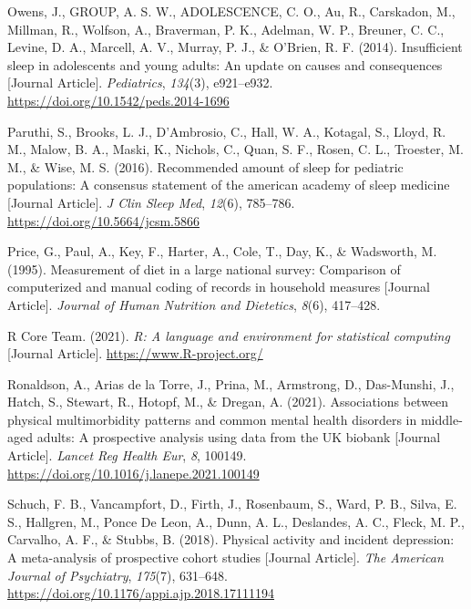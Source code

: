 \documentclass[
  letterpaper,
  DIV=11,
  numbers=noendperiod]{scrreport}
\newlength{\cslhangindent}
\newenvironment{CSLReferences}[2] %
 {\begin{list}{}{%
  \setlength{\itemindent}{0pt}
  \setlength{\leftmargin}{0pt}
  \setlength{\parsep}{0pt}
  \ifodd #1
   \setlength{\leftmargin}{\cslhangindent}
   \setlength{\itemindent}{-1\cslhangindent}
  \fi
  \setlength{\itemsep}{#2\baselineskip}}}
 {\end{list}}
\begin{document}
\begin{CSLReferences}{1}{0}
Owens, J., GROUP, A. S. W., ADOLESCENCE, C. O., Au, R., Carskadon, M.,
Millman, R., Wolfson, A., Braverman, P. K., Adelman, W. P., Breuner, C.
C., Levine, D. A., Marcell, A. V., Murray, P. J., \& O'Brien, R. F.
(2014). Insufficient sleep in adolescents and young adults: An update on
causes and consequences {[}Journal Article{]}. \emph{Pediatrics},
\emph{134}(3), e921--e932. \url{https://doi.org/10.1542/peds.2014-1696}

Paruthi, S., Brooks, L. J., D'Ambrosio, C., Hall, W. A., Kotagal, S.,
Lloyd, R. M., Malow, B. A., Maski, K., Nichols, C., Quan, S. F., Rosen,
C. L., Troester, M. M., \& Wise, M. S. (2016). Recommended amount of
sleep for pediatric populations: A consensus statement of the american
academy of sleep medicine {[}Journal Article{]}. \emph{J Clin Sleep
Med}, \emph{12}(6), 785--786. \url{https://doi.org/10.5664/jcsm.5866}

Price, G., Paul, A., Key, F., Harter, A., Cole, T., Day, K., \&
Wadsworth, M. (1995). Measurement of diet in a large national survey:
Comparison of computerized and manual coding of records in household
measures {[}Journal Article{]}. \emph{Journal of Human Nutrition and
Dietetics}, \emph{8}(6), 417--428.

R Core Team. (2021). \emph{R: A language and environment for statistical
computing} {[}Journal Article{]}. \url{https://www.R-project.org/}

Ronaldson, A., Arias de la Torre, J., Prina, M., Armstrong, D.,
Das-Munshi, J., Hatch, S., Stewart, R., Hotopf, M., \& Dregan, A.
(2021). Associations between physical multimorbidity patterns and common
mental health disorders in middle-aged adults: A prospective analysis
using data from the UK biobank {[}Journal Article{]}. \emph{Lancet Reg
Health Eur}, \emph{8}, 100149.
\url{https://doi.org/10.1016/j.lanepe.2021.100149}

Schuch, F. B., Vancampfort, D., Firth, J., Rosenbaum, S., Ward, P. B.,
Silva, E. S., Hallgren, M., Ponce De Leon, A., Dunn, A. L., Deslandes,
A. C., Fleck, M. P., Carvalho, A. F., \& Stubbs, B. (2018). Physical
activity and incident depression: A meta-analysis of prospective cohort
studies {[}Journal Article{]}. \emph{The American Journal of
Psychiatry}, \emph{175}(7), 631--648.
\url{https://doi.org/10.1176/appi.ajp.2018.17111194}


\end{CSLReferences}
\end{document}
